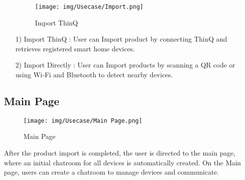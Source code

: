 \documentclass[conference]{IEEEtran}
\begin{document}
\begin{enumerate}
\begin{figure}[h]
\hspace{1.5cm}
\centering
\begin{minipage}{0.4\columnwidth}
    \texttt{[image: img/Usecase/Import.png]}
    \caption{Import ThinQ}
\end{minipage}
\end{figure}
    \item [1)] Import ThinQ : User can Import product by connecting ThinQ and retrieves registered smart home devices. \\
\end{enumerate}

\begin{enumerate}
\begin{figure}[h]
\hspace{1.5cm}
\centering
\begin{minipage}{0.4\columnwidth}
    \texttt{[image: img/Usecase/Import Directly.jpg]}
    \caption{\\ Import Directly}
\end{minipage}
\end{figure}
    \item [2)] Import Directly : User can Import products by scanning a QR code or using Wi-Fi and Bluetooth to detect nearby devices.
\end{enumerate}

\subsection{Main Page}
\begin{figure}[h]
\hspace{1.5cm}
\centering
\begin{minipage}{0.4\columnwidth}
    \texttt{[image: img/Usecase/Main Page.png]}
    \caption{Main Page}
\end{minipage}
\end{figure}
After the product import is completed, the user is directed to the main page, where an initial chatroom for all devices is automatically created. On the Main page, users can create a chatroom to manage devices and communicate. 

\clearpage
\end{document}
